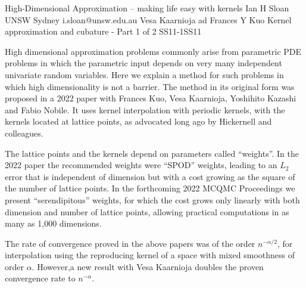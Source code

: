 \begin{talk}
  {High-Dimensional Approximation -- making life easy with kernels}%
  {Ian H Sloan}%
  {UNSW Sydney}%
  {i.sloan@unsw.edu.au}%
  {Vesa Kaarnioja ad Frances Y Kuo}%
{Kernel approximation and cubature - Part 1 of 2}
{}{SS11-1}{SS11}

			
High dimensional approximation problems commonly arise from parametric PDE problems in which the parametric input depends on very many independent univariate random variables.  Here we explain a method for such problems in which high dimensionality is not a barrier.
 The method in its original form was proposed in a 2022 paper with Frances Kuo, Vesa Kaarnioja, Yoshihito Kazashi and Fabio Nobile.  It uses kernel interpolation with periodic kernels, with the kernels located at lattice points, as advocated long ago by Hickernell and colleagues.

The lattice points and the kernels depend on parameters called “weights”.  In the 2022 paper the recommended weights were “SPOD” weights, leading to an $L_2$ error that is independent of dimension but with a cost growing as the square of the number of lattice points.   In the forthcoming 2022 MCQMC Proceedings we present “serendipitous” weights, for which the cost grows only linearly with both dimension and number of lattice points, allowing practical computations in as many as 1,000 dimensions.

The rate of convergence proved in the above papers was of the order $n^{-\alpha/2}$, for interpolation using the  reproducing kernel of a space with mixed smoothness of order $\alpha$.  However,a new result with Vesa Kaarnioja doubles the proven convergence rate to $n^{-\alpha}$.

\end{talk}

